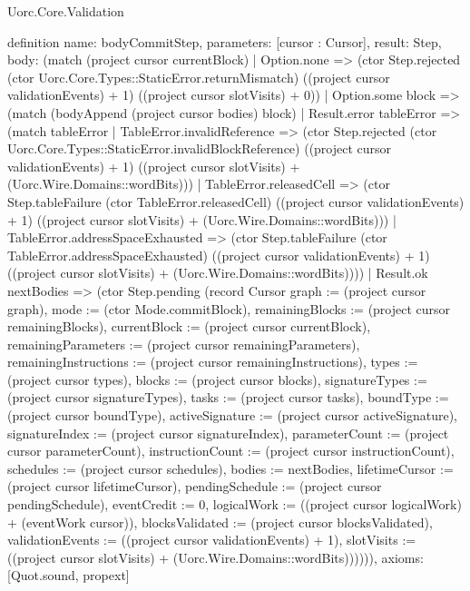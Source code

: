 \begin{lexlean}{Uorc.Core.Validation}
\begin{semanticmodule}
definition{
  name: bodyCommitStep,
  parameters: [cursor : Cursor],
  result: Step,
  body: (match (project cursor currentBlock)
    | Option.none => (ctor Step.rejected (ctor Uorc.Core.Types::StaticError.returnMismatch) ((project cursor validationEvents) + 1) ((project cursor slotVisits) + 0))
    | Option.some block => (match (bodyAppend (project cursor bodies) block)
      | Result.error tableError => (match tableError
        | TableError.invalidReference => (ctor Step.rejected (ctor Uorc.Core.Types::StaticError.invalidBlockReference) ((project cursor validationEvents) + 1) ((project cursor slotVisits) + (Uorc.Wire.Domains::wordBits)))
        | TableError.releasedCell => (ctor Step.tableFailure (ctor TableError.releasedCell) ((project cursor validationEvents) + 1) ((project cursor slotVisits) + (Uorc.Wire.Domains::wordBits)))
        | TableError.addressSpaceExhausted => (ctor Step.tableFailure (ctor TableError.addressSpaceExhausted) ((project cursor validationEvents) + 1) ((project cursor slotVisits) + (Uorc.Wire.Domains::wordBits))))
      | Result.ok nextBodies => (ctor Step.pending (record Cursor {graph := (project cursor graph), mode := (ctor Mode.commitBlock), remainingBlocks := (project cursor remainingBlocks), currentBlock := (project cursor currentBlock), remainingParameters := (project cursor remainingParameters), remainingInstructions := (project cursor remainingInstructions), types := (project cursor types), blocks := (project cursor blocks), signatureTypes := (project cursor signatureTypes), tasks := (project cursor tasks), boundType := (project cursor boundType), activeSignature := (project cursor activeSignature), signatureIndex := (project cursor signatureIndex), parameterCount := (project cursor parameterCount), instructionCount := (project cursor instructionCount), schedules := (project cursor schedules), bodies := nextBodies, lifetimeCursor := (project cursor lifetimeCursor), pendingSchedule := (project cursor pendingSchedule), eventCredit := 0, logicalWork := ((project cursor logicalWork) + (eventWork cursor)), blocksValidated := (project cursor blocksValidated), validationEvents := ((project cursor validationEvents) + 1), slotVisits := ((project cursor slotVisits) + (Uorc.Wire.Domains::wordBits))})))),
  axioms: [Quot.sound, propext]
}


\end{semanticmodule}
\end{lexlean}

